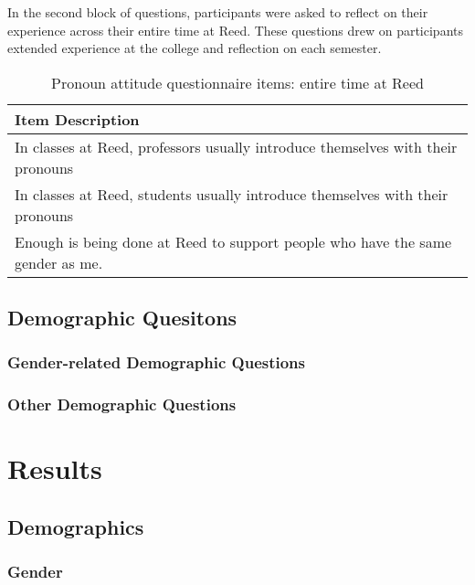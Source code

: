 \documentclass[12pt,twoside]{reedthesis}
\begin{document}
In the second block of questions, participants were asked to reflect on their experience across their entire time at Reed. These questions drew on participants extended experience at the college and reflection on each semester.
\begin{table}

\caption{\label{tab:unnamed-chunk-2}Pronoun attitude questionnaire items: entire time at Reed}
\centering
\begin{tabular}[t]{l}
\hline
Item Description\\
\hline
In classes at Reed, professors usually introduce themselves with their pronouns\\
\hline
In classes at Reed, students usually introduce themselves with their pronouns\\
\hline
Enough is being done at Reed to support people who have the same gender as me.\\
\hline
\end{tabular}
\end{table}
\hypertarget{demographic-quesitons}{%
\section{Demographic Quesitons}\label{demographic-quesitons}}

\hypertarget{gender-related-demographic-questions}{%
\subsection{Gender-related Demographic Questions}\label{gender-related-demographic-questions}}

\hypertarget{other-demographic-questions}{%
\subsection{Other Demographic Questions}\label{other-demographic-questions}}

\hypertarget{results}{%
\chapter{Results}\label{results}}

\hypertarget{demographics}{%
\section{Demographics}\label{demographics}}

\hypertarget{gender}{%
\subsection{Gender}\label{gender}}
\end{document}
